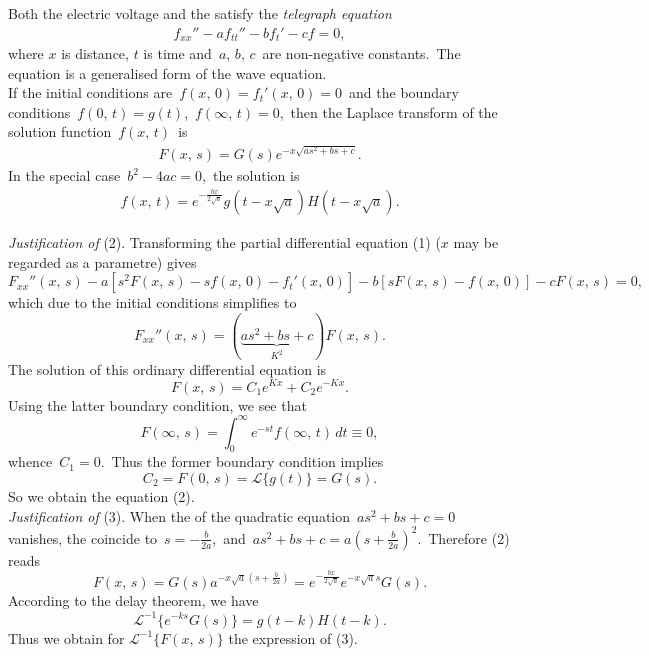 \documentclass[12pt]{article}
\theoremstyle{definition}
\begin{document}
Both the electric voltage and the  satisfy the {\em telegraph equation}
\begin{align}
f_{xx}''-af_{tt}''-bf_t'-cf = 0,
\end{align}
where $x$ is distance, $t$ is time and\, $a,\,b,\,c$\, are non-negative constants.\, The equation is a generalised form of the wave equation.\\

If the initial conditions are\, $f(x,\,0) = f_t'(x,\,0) = 0$\, and the boundary conditions \,$f(0,\,t) = g(t)$,\, $f(\infty,\,t) = 0$,\, then the Laplace transform of the solution function \,$f(x,\,t)$\, is
\begin{align}
F(x,\,s) = G(s)e^{-x\sqrt{as^2+bs+c}}.
\end{align}
In the special case\, $b^2-4ac = 0$,\, the solution is
\begin{align}
f(x,\,t) = e^{-\frac{bx}{2\sqrt{a}}}g(t-x\sqrt{a})H(t-x\sqrt{a}).
\end{align}

{\em Justification of} (2).\; Transforming the partial differential equation (1) ($x$ may be regarded as a parametre) gives
$$F_{xx}''(x,\,s)-a[s^2F(x,\,s)-sf(x,\,0)-f_t'(x,\,0)]-b[sF(x,\,s)-f(x,\,0)]-cF(x,\,s) = 0,$$
which due to the initial conditions simplifies to
$$F_{xx}''(x,\,s) = (\underbrace{as^2+bs+c}_{K^2})F(x,\,s).$$
The solution of this ordinary differential equation is
$$F(x,\,s) = C_1e^{Kx}+C_2e^{-Kx}.$$
Using the latter boundary condition, we see that
$$F(\infty,\,s) = \int_0^\infty e^{-st}f(\infty,\,t)\,dt \equiv 0,$$
whence\, $C_1 = 0$.\, Thus the former boundary condition implies
$$C_2 = F(0,\,s) = \mathcal{L}\{g(t)\} = G(s).$$
So we obtain the equation (2).\\

{\em Justification of} (3).\; When the  of the quadratic equation \,$as^2\!+\!bs\!+\!c = 0$\, vanishes, the  coincide to\, $s = -\frac{b}{2a}$,\, and\, $as^2\!+\!bs\!+\!c = a(s+\frac{b}{2a})^2$.\, Therefore (2) reads
$$F(x,\,s) = G(s)a^{-x\sqrt{a}(s+\frac{b}{2a})} = e^{-\frac{bx}{2\sqrt{a}}}e^{-x\sqrt{a}s}G(s).$$
According to the delay theorem, we have
$$\mathcal{L}^{-1}\{e^{-ks}G(s)\} = g(t-k)H(t-k).$$
Thus we obtain for $\mathcal{L}^{-1}\{F(x,\,s)\}$ the expression of (3).
\end{document}
